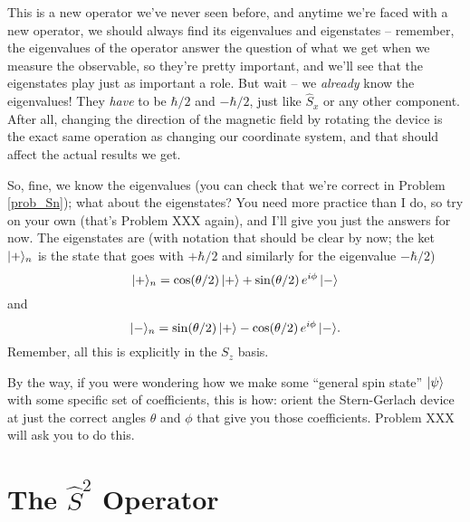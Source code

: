 This is a new operator we've never seen before, and anytime we're faced with a new operator, we should always find its eigenvalues and eigenstates -- remember, the eigenvalues of the operator answer the question of what we get when we measure the observable, so they're pretty important, and we'll see that the eigenstates play just as important a role.  But wait -- we \emph{already} know the eigenvalues!  They \emph{have} to be $\hbar/2$ and $-\hbar/2$, just like $\hat{S}_x$ or any other component.  After all, changing the direction of the magnetic field by rotating the device is the exact same operation as changing our coordinate system, and that should affect the actual results we get.

So, fine, we know the eigenvalues (you can check that we're correct in Problem \ref{prob_Sn}); what about the eigenstates?  You need more practice than I do, so try on your own (that's Problem XXX again), and I'll give you just the answers for now.  The eigenstates are (with notation that should be clear by now; the ket $| + \rangle_n$ is the state that goes with $+\hbar/2$ and similarly for the eigenvalue $-\hbar/2$)
\begin{equation}
\label{eq_plus_n}
| + \rangle_n = \cos (\theta/2) \, | + \rangle + \sin (\theta/2) \, e^{i\phi} \, | - \rangle
\end{equation}
and
\begin{equation}
\label{eq_minus_n}
| - \rangle_n = \sin (\theta/2) \, | + \rangle - \cos (\theta/2) \, e^{i\phi} \, | - \rangle.
\end{equation}
Remember, all this is explicitly in the $S_z$ basis.

By the way, if you were wondering how we make some ``general spin state'' $| \psi \rangle$ with some specific set of coefficients, this is how:  orient the Stern-Gerlach device at just the correct angles $\theta$ and $\phi$ that give you those coefficients.  Problem XXX will ask you to do this.


\section{The $\hat{S}^2$ Operator}

